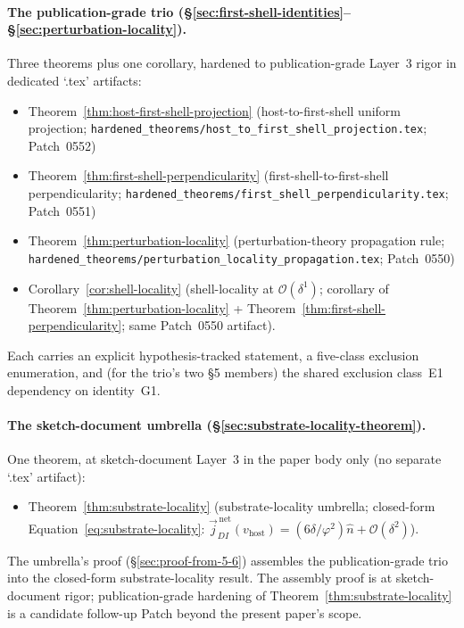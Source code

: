 \documentclass[11pt,letterpaper]{article}
\newcommand{\phig}{\varphi}
\newcommand{\vhost}{v_{\text{host}}}
\newcommand{\jDInet}{\vec{j}_{DI}^{\,\text{net}}}
\newcommand{\bigO}[1]{\mathcal{O}(#1)}
\begin{document}
\paragraph{The publication-grade trio (\S\ref{sec:first-shell-identities}--\S\ref{sec:perturbation-locality}).}
Three theorems plus one corollary, hardened to publication-grade Layer~3 rigor in dedicated `.tex' artifacts:
\begin{itemize}[leftmargin=2em]
\item Theorem~\ref{thm:host-first-shell-projection} (host-to-first-shell uniform projection; \texttt{hardened\_theorems/host\_to\_first\_shell\_projection.tex}; Patch~0552)
\item Theorem~\ref{thm:first-shell-perpendicularity} (first-shell-to-first-shell perpendicularity; \texttt{hardened\_theorems/first\_shell\_perpendicularity.tex}; Patch~0551)
\item Theorem~\ref{thm:perturbation-locality} (perturbation-theory propagation rule; \texttt{hardened\_theorems/perturbation\_locality\_propagation.tex}; Patch~0550)
\item Corollary~\ref{cor:shell-locality} (shell-locality at $\bigO{\delta^1}$; corollary of Theorem~\ref{thm:perturbation-locality} + Theorem~\ref{thm:first-shell-perpendicularity}; same Patch~0550 artifact).
\end{itemize}
Each carries an explicit hypothesis-tracked statement, a five-class exclusion enumeration, and (for the trio's two §5 members) the shared exclusion class~E1 dependency on identity~G1.

\paragraph{The sketch-document umbrella (\S\ref{sec:substrate-locality-theorem}).}
One theorem, at sketch-document Layer~3 in the paper body only (no separate `.tex' artifact):
\begin{itemize}[leftmargin=2em]
\item Theorem~\ref{thm:substrate-locality} (substrate-locality umbrella; closed-form Equation~\eqref{eq:substrate-locality}: $\jDInet(\vhost) = (6\delta/\phig^2) \hat{n} + \bigO{\delta^2}$).
\end{itemize}
The umbrella's proof (\S\ref{sec:proof-from-5-6}) assembles the publication-grade trio into the closed-form substrate-locality result. The assembly proof is at sketch-document rigor; publication-grade hardening of Theorem~\ref{thm:substrate-locality} is a candidate follow-up Patch beyond the present paper's scope.
\end{document}

